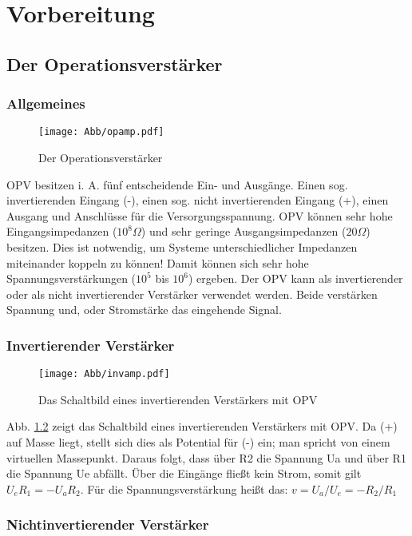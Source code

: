 \chapter{Vorbereitung}
\section{Der Operationsverstärker}
\subsection{Allgemeines}

\begin{figure}[H]
     \centering
     \texttt{[image: Abb/opamp.pdf]}
     \caption{Der Operationsverstärker}
     \label{opamp}
\end{figure}
OPV besitzen i. A. fünf entscheidende Ein- und Ausgänge. Einen sog. invertierenden Eingang (-), einen sog. nicht invertierenden Eingang (+), einen Ausgang und Anschlüsse für die Versorgungsspannung.
OPV können sehr hohe Eingangsimpedanzen ($10^{8} \Omega$) und sehr geringe Ausgangsimpedanzen ($20 \Omega$) besitzen. Dies ist notwendig, um Systeme unterschiedlicher Impedanzen miteinander koppeln zu können! Damit können sich sehr hohe Spannungsverstärkungen ($10^{5}$ bis $10^{6}$) ergeben.
Der OPV kann als invertierender oder als nicht invertierender Verstärker verwendet werden. Beide verstärken Spannung und, oder Stromstärke das eingehende Signal.

\subsection{Invertierender Verstärker}

\begin{figure}[H]
    \centering 
    \texttt{[image: Abb/invamp.pdf]}
    \caption{Das Schaltbild eines invertierenden Verstärkers mit OPV}
    \label{inv}
\end{figure}
Abb. \ref{inv} zeigt das Schaltbild eines invertierenden Verstärkers mit OPV. Da (+) auf Masse liegt, stellt sich dies als Potential für (-) ein; man spricht von einem virtuellen Massepunkt. Daraus folgt, dass über R2 die Spannung Ua und über R1 die Spannung Ue abfällt. Über die Eingänge fließt kein Strom, somit gilt $U_eR_1=-U_aR_2$. Für die Spannungsverstärkung heißt das:
$v= U_a/U_e =-R_2/R_1$

\subsection{Nichtinvertierender Verstärker}

